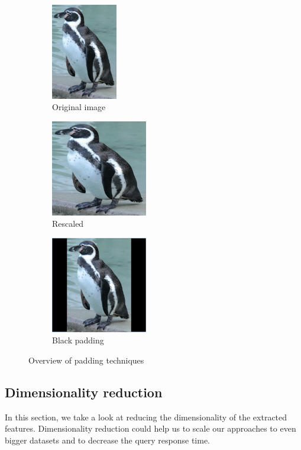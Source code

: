 \begin{figure}
     \centering
     \begin{subfigure}[b]{0.3\textwidth}
         \centering
         \includegraphics[height=4.2cm]{img/original.png}
         \caption{Original image}
     \end{subfigure}
     \hfill
     \begin{subfigure}[b]{0.3\textwidth}
         \centering
         \includegraphics[height=4.2cm]{img/original-distortion.png}
         \caption{Rescaled}
     \end{subfigure}
     \hfill
     \begin{subfigure}[b]{0.3\textwidth}
         \centering
         \includegraphics[height=4.2cm]{img/black_padding.png}
         \caption{Black padding}
     \end{subfigure}
        \caption{Overview of padding techniques}
        \label{fig:penguin}
\end{figure}

\subsection{Dimensionality reduction}

In this section, we take a look at reducing the dimensionality of the extracted features. Dimensionality reduction could help us to scale our approaches to even bigger datasets and to decrease the query response time.

